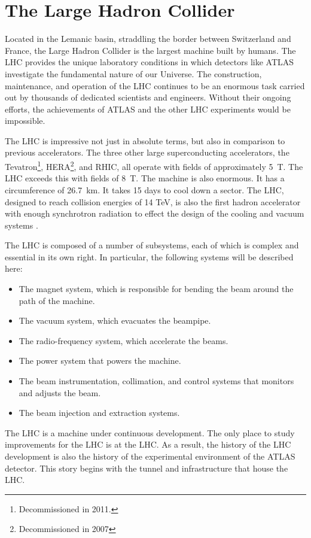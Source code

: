 \section{The Large Hadron Collider}

Located in the Lemanic basin, straddling the border between Switzerland and France, the Large Hadron Collider is the largest machine built by humans.
The LHC provides the unique laboratory conditions in which detectors like ATLAS investigate the fundamental nature of our Universe.
The construction, maintenance, and operation of the LHC continues to be an enormous task carried out by thousands of dedicated scientists and engineers. Without their ongoing efforts, the achievements of ATLAS and the other LHC experiments would be impossible.

The LHC is impressive not just in absolute terms, but also in comparison to previous accelerators.
The three other large superconducting accelerators, the Tevatron\footnote{Decommissioned in 2011.}, HERA\footnote{Decommissioned in 2007}, and RHIC, all operate with fields of approximately 5~T. The LHC exceeds this with fields of 8~T.
The machine is also enormous. It has a circumference of 26.7~km. It takes 15 days to cool down a sector.
The LHC, designed to reach collision energies of 14 TeV, is also the first hadron accelerator with enough synchrotron radiation to effect the design of the cooling and vacuum systems \cite{lyndon}.

The LHC is composed of a number of subsystems, each of which is complex and essential in its own right.
In particular, the following systems will be described here:
\begin{itemize}
    \item The magnet system, which is responsible for bending the beam around the path of the machine.
    \item The vacuum system, which evacuates the beampipe.
    \item The radio-frequency system, which accelerate the beams. 
    \item The power system that powers the machine.
    \item The beam instrumentation, collimation, and control systems that monitors and adjusts the beam.
    \item The beam injection and extraction systems.
\end{itemize}
The LHC is a machine under continuous development. The only place to study improvements for the LHC is at the LHC.
As a result, the history of the LHC development is also the history of the experimental environment of the ATLAS detector.
This story begins with the tunnel and infrastructure that house the LHC.

